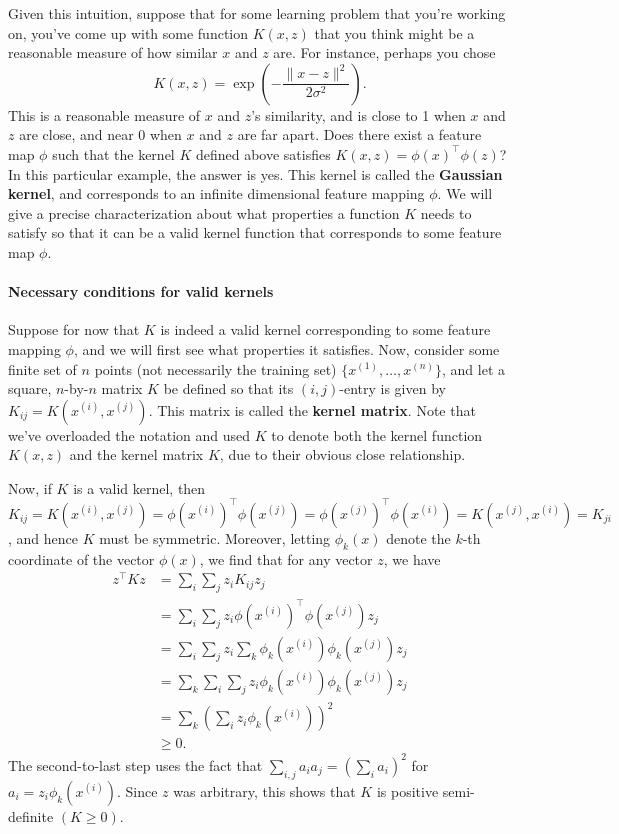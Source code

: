 Given this intuition, suppose that for some learning problem that you're
working on, you've come up with some function $K(x,z)$ that you think might
be a reasonable measure of how similar $x$ and $z$ are. For instance, perhaps
you chose
\begin{equation*}
    K(x,z) = \exp\left(-\frac{\lVert x - z \rVert^2}{2\sigma^2}\right).    
\end{equation*}
This is a reasonable measure of $x$ and $z$'s similarity, and is close to 1 when
$x$ and $z$ are close, and near 0 when $x$ and $z$ are far apart. Does there exist
a feature map $\phi$ such that the kernel $K$ defined above satisfies $K(x,z) =
\phi(x)^\top \phi(z)$? In this particular example, the answer is yes. This kernel is called
the \textbf{Gaussian kernel}, and corresponds to an infinite dimensional feature
mapping $\phi$. We will give a precise characterization about what properties
a function $K$ needs to satisfy so that it can be a valid kernel function that
corresponds to some feature map $\phi$.

\paragraph{Necessary conditions for valid kernels} Suppose for now that $K$ is
indeed a valid kernel corresponding to some feature mapping $\phi$, and we will
first see what properties it satisfies. Now, consider some finite set of $n$ points
(not necessarily the training set) $\{x^{(1)} ,\ldots ,x^{(n)} \}$, and let a square, $n$-by-$n$
matrix $K$ be defined so that its $(i,j)$-entry is given by $K_{ij} = K(x^{(i)}, x^{(j)})$.
This matrix is called the \textbf{kernel matrix}. Note that we've overloaded the
notation and used $K$ to denote both the kernel function $K(x,z)$ and the
kernel matrix $K$, due to their obvious close relationship.

Now, if $K$ is a valid kernel, then $K_{ij} = K(x^{(i)} ,x^{(j)} ) = \phi(x^{(i)} )^\top \phi(x^{(j)} ) =
\phi(x^{(j)} )^\top \phi(x^{(i)} ) = K(x^{(j)} ,x^{(i)} ) = K_{ji}$, and hence $K$ must be symmetric. Moreover,
letting $\phi_k (x)$ denote the $k$-th coordinate of the vector $\phi(x)$, we find that
for any vector $z$, we have
\begin{align*}
    z^\top K z &= \sum_i \sum_j z_i K_{ij} z_j\\
    &= \sum_i \sum_j z_i \phi(x^{(i)} )^\top \phi(x^{(j)} )z_j\\
    &= \sum_i \sum_j z_i \sum_k \phi_k (x^{(i)} )\phi_k (x^{(j)} )z_j\\
    &= \sum_k \sum_i \sum_j z_i \phi_k (x^{(i)} )\phi_k (x^{(j)} )z_j\\
    &= \sum_k \left( \sum_i z_i \phi_k (x^{(i)} ) \right)^2\\
    &\ge 0.
\end{align*}
The second-to-last step uses the fact that $\sum_{i,j} a_i a_j = ( \sum_i a_i)^2$ for $a_i =
z_i \phi_k (x^{(i)})$. Since $z$ was arbitrary, this shows that $K$ is positive semi-definite
$(K \ge 0)$.

